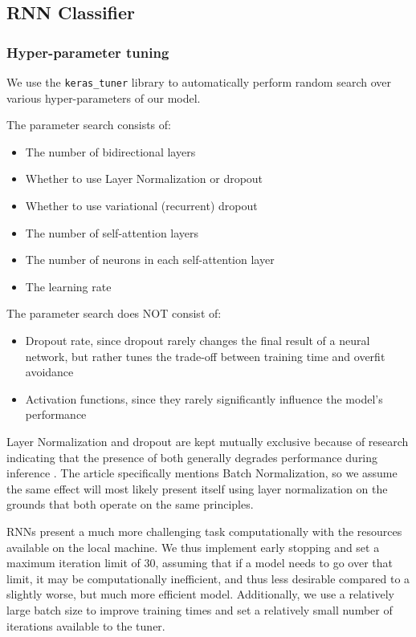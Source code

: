 \documentclass[10pt, a4paper]{article}
\begin{document}
	
	\subsection{RNN Classifier}
	
	\subsubsection{Hyper-parameter tuning}
	
	We use the \texttt{keras\_tuner} library to automatically perform random search over various hyper-parameters of our model.
	
	The parameter search consists of:
	\begin{itemize}
		\item The number of bidirectional layers
		\item Whether to use Layer Normalization or dropout
		\item Whether to use variational (recurrent) dropout
		\item The number of self-attention layers
		\item The number of neurons in each self-attention layer
		\item The learning rate
	\end{itemize}
	
	
	The parameter search does NOT consist of:
	\begin{itemize}
		\item Dropout rate, since dropout rarely changes the final result of a neural network, but rather tunes the trade-off between training time and overfit avoidance
		\item Activation functions, since they rarely significantly influence the model's performance
	\end{itemize}

	Layer Normalization and dropout are kept mutually exclusive because of research indicating that the presence of both generally degrades performance during inference \cite{dropout-norm}. The article specifically mentions Batch Normalization, so we assume the same effect will most likely present itself using layer normalization on the grounds that both operate on the same principles.
	
	RNNs present a much more challenging task computationally with the resources available on the local machine. We thus implement early stopping and set a maximum iteration limit of $30$, assuming that if a model needs to go over that limit, it may be computationally inefficient, and thus less desirable compared to a slightly worse, but much more efficient model. Additionally, we use a relatively large batch size to improve training times and set a relatively small number of iterations available to the tuner.
	
\end{document}
